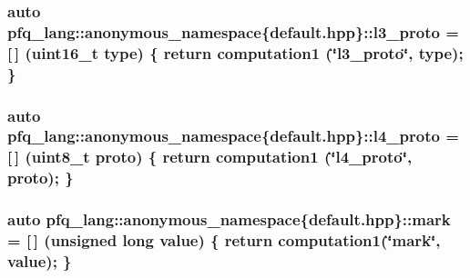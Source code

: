 \hypertarget{namespacepfq__lang_1_1anonymous__namespace_02default_8hpp_03_aed01dd5380a873d92397ec0d4c07abac}{
\subsubsection[{l3\-\_\-proto}]{\setlength{\rightskip}{0pt plus 5cm}auto pfq\-\_\-lang\-::anonymous\-\_\-namespace\{default.\-hpp\}\-::l3\-\_\-proto = \mbox{[}$\,$\mbox{]} (uint16\-\_\-t type) \{ return {\bf computation1} (\char`\"{}l3\-\_\-proto\char`\"{}, type); \}}}\label{namespacepfq__lang_1_1anonymous__namespace_02default_8hpp_03_aed01dd5380a873d92397ec0d4c07abac}
\hypertarget{namespacepfq__lang_1_1anonymous__namespace_02default_8hpp_03_a75da77904f1cff4cc42fc3a081f80670}{
\subsubsection[{l4\-\_\-proto}]{\setlength{\rightskip}{0pt plus 5cm}auto pfq\-\_\-lang\-::anonymous\-\_\-namespace\{default.\-hpp\}\-::l4\-\_\-proto = \mbox{[}$\,$\mbox{]} (uint8\-\_\-t proto) \{ return {\bf computation1} (\char`\"{}l4\-\_\-proto\char`\"{}, proto); \}}}\label{namespacepfq__lang_1_1anonymous__namespace_02default_8hpp_03_a75da77904f1cff4cc42fc3a081f80670}
\hypertarget{namespacepfq__lang_1_1anonymous__namespace_02default_8hpp_03_ad6142fe3a0fc859f25ea16956f52a5f0}{
\subsubsection[{mark}]{\setlength{\rightskip}{0pt plus 5cm}auto pfq\-\_\-lang\-::anonymous\-\_\-namespace\{default.\-hpp\}\-::mark = \mbox{[}$\,$\mbox{]} (unsigned long value) \{ return {\bf computation1}(\char`\"{}mark\char`\"{}, value); \}}}\label{namespacepfq__lang_1_1anonymous__namespace_02default_8hpp_03_ad6142fe3a0fc859f25ea16956f52a5f0}
